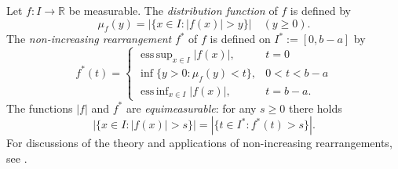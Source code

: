\documentclass{amsart}
\DeclareMathOperator*{\esssup}{ess\,sup}
\DeclareMathOperator*{\essinf}{ess\,inf}
\numberwithin{equation}{section}
\begin{document}
Let $f:I\rightarrow\mathbb{R}$ be measurable. The \emph{distribution function} of $f$ is defined by
\begin{equation}
    \nonumber
    \mu_f(y)=|\{x\in I:|f(x)|>y\}|\quad(y\ge0).
\end{equation}
The  \emph{non-increasing rearrangement} $f^*$ of $f$ is defined on $I^*:=[0,b-a]$ by
\begin{equation}
    \nonumber
    f^*(t)=\begin{cases}
        \esssup_{x\in I}|f(x)|,&t=0\\
        \inf\{y>0:\mu_f(y)<t\},&0<t<b-a\\
        \essinf_{x\in I}|f(x)|,&t=b-a.
    \end{cases}
\end{equation}
The functions $|f|$ and $f^*$ are \emph{equimeasurable}: for any $s\ge0$ there holds
\begin{equation}
    \label{equimeasurable}
    |\{x\in I:|f(x)|>s\}|=|\{t\in I^*:f^*(t)>s\}|.
\end{equation}
For discussions of the theory and applications of non-increasing rearrangements, see \cite{BeSh88, Ko07}.
\end{document}
